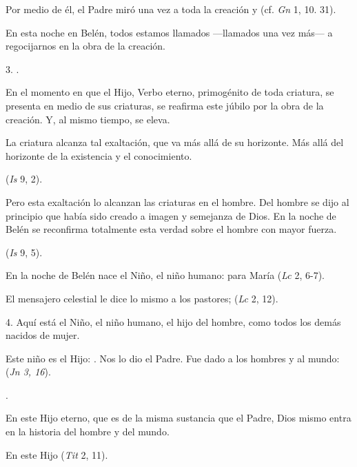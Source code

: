 \begin{body}
	Por medio de él, el Padre miró una vez a toda la creación y  (cf. \emph{Gn} 1, 10. 31).
	
	En esta noche en Belén, todos estamos llamados ---llamados una vez más--- a regocijarnos en la obra de la creación.
	
	3. .
	
	En el momento en que el Hijo, Verbo eterno, primogénito de toda criatura, se presenta en medio de sus criaturas, se reafirma este júbilo por la obra de la creación. Y, al mismo tiempo, se eleva.
	
	La criatura alcanza tal exaltación, que va más allá de su horizonte. Más allá del horizonte de la existencia y el conocimiento.
	
	 (\emph{Is} 9, 2).
	
	Pero esta exaltación lo alcanzan las criaturas en el hombre. Del hombre se dijo al principio que había sido creado a imagen y semejanza de Dios. En la noche de Belén se reconfirma totalmente esta verdad sobre el hombre con mayor fuerza.
	
	 (\emph{Is} 9, 5).
	
	En la noche de Belén nace el Niño, el niño humano: para María  (\emph{Lc} 2, 6-7).
	
	El mensajero celestial le dice lo mismo a los pastores;  (\emph{Lc} 2, 12).
	
	4. Aquí está el Niño, el niño humano, el hijo del hombre, como todos los demás nacidos de mujer.
	
	Este niño es el Hijo: . Nos lo dio el Padre. Fue dado a los hombres y al mundo:  (\emph{Jn 3, 16}).
	
	.
	
	En este Hijo eterno, que es de la misma sustancia que el Padre, Dios mismo entra en la historia del hombre y del mundo.
	
	En este Hijo  (\emph{Tit} 2, 11).
	

\end{body}
